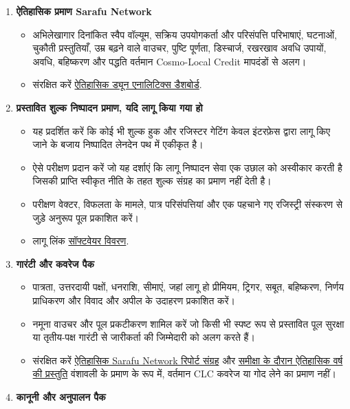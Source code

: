 \documentclass[11pt]{article}
\begin{document}
\begin{enumerate}[leftmargin=*]
\item \textbf{ऐतिहासिक प्रमाण Sarafu Network}
\begin{itemize}[leftmargin=*]
\item अभिलेखागार दिनांकित स्वैप वॉल्यूम, सक्रिय उपयोगकर्ता और परिसंपत्ति परिभाषाएं, घटनाओं, चुकौती प्रस्तुतियाँ, उम्र बढ़ने वाले वाउचर, पुष्टि पूर्णता, डिस्चार्ज, रखरखाव अवधि उपायों, अवधि, बहिष्करण और पद्धति वर्तमान Cosmo-Local Credit मापदंडों से अलग।
\item संरक्षित करें \href{https://dune.com/grassrootseconomics/sarafu-network}{ऐतिहासिक ड्यून एनालिटिक्स डैशबोर्ड}.
\end{itemize}
\item \textbf{प्रस्तावित शुल्क निष्पादन प्रमाण, यदि लागू किया गया हो}
\begin{itemize}[leftmargin=*]
\item यह प्रदर्शित करें कि कोई भी शुल्क हुक और रजिस्टर गेटिंग केवल इंटरफ़ेस द्वारा लागू किए जाने के बजाय निष्पादित लेनदेन पथ में एकीकृत है।
\item ऐसे परीक्षण प्रदान करें जो यह दर्शाएं कि लागू निष्पादन सेवा एक उछाल को अस्वीकार करती है जिसकी प्राप्ति स्वीकृत नीति के तहत शुल्क संग्रह का प्रमाण नहीं देती है।
\item परीक्षण वेक्टर, विफलता के मामले, पात्र परिसंपत्तियां और एक पहचाने गए रजिस्ट्री संस्करण से जुड़े अनुरूप पूल प्रकाशित करें।
\item लागू लिंक \href{https://software.grassecon.org}{सॉफ्टवेयर विवरण}.
\end{itemize}
\item \textbf{गारंटी और कवरेज पैक}
\begin{itemize}[leftmargin=*]
\item पात्रता, उत्तरदायी पक्षों, धनराशि, सीमाएं, जहां लागू हो प्रीमियम, ट्रिगर, सबूत, बहिष्करण, निर्णय प्राधिकरण और विवाद और अपील के उदाहरण प्रकाशित करें।
\item नमूना वाउचर और पूल प्रकटीकरण शामिल करें जो किसी भी स्पष्ट रूप से प्रस्तावित पूल सुरक्षा या तृतीय-पक्ष गारंटी से जारीकर्ता की जिम्मेदारी को अलग करते हैं।
\item संरक्षित करें \href{https://sarafu.network/reports}{ऐतिहासिक Sarafu Network रिपोर्ट संग्रह} और \href{https://youtu.be/5yGaP31bvs0?si=fZ-AMTEXsmVR8Ulv}{समीक्षा के दौरान ऐतिहासिक वर्ष की प्रस्तुति} वंशावली के प्रमाण के रूप में, वर्तमान CLC कवरेज या गोद लेने का प्रमाण नहीं।
\end{itemize}
\item \textbf{कानूनी और अनुपालन पैक}

\end{enumerate}
\end{document}
